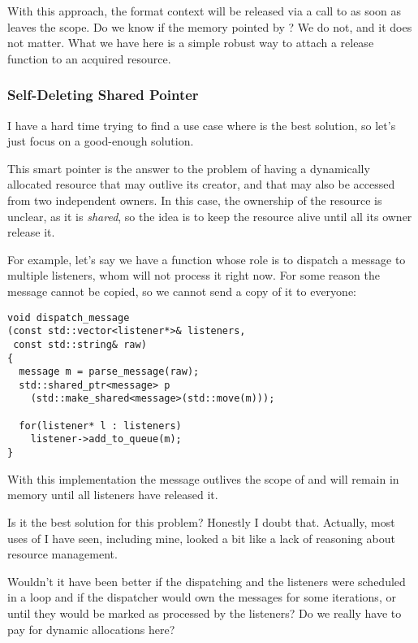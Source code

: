 With this approach, the format context will be released via a call to
 as soon as
 leaves the scope. Do we know if the memory
pointed by ? We do not, and it does not
matter. What we have here is a simple robust way to attach a release
function to an acquired resource.

\subsubsection{Self-Deleting Shared Pointer}

%
%
I have a hard time trying to find a use case where
 is the best solution, so let's just focus on a
good-enough solution.

This smart pointer is the answer to the problem of having a
dynamically allocated resource that may outlive its creator, and that
may also be accessed from two independent owners. In this case, the
ownership of the resource is unclear, as it is \emph{shared}, so the
idea is to keep the resource alive until all its owner release it.

For example, let's say we have a function whose role is to dispatch a
message to multiple listeners, whom will not process it right now. For
some reason the message cannot be copied, so we cannot send a copy of
it to everyone:

\begin{lstlisting}
void dispatch_message
(const std::vector<listener*>& listeners,
 const std::string& raw)
{
  message m = parse_message(raw);
  std::shared_ptr<message> p
    (std::make_shared<message>(std::move(m)));

  for(listener* l : listeners)
    listener->add_to_queue(m);
}
\end{lstlisting}

With this implementation the message outlives the scope of
 and will remain in memory until all
listeners have released it.

Is it the best solution for this problem? Honestly I doubt
that. Actually, most uses of  I have seen,
including mine, looked a bit like a lack of reasoning about resource
management.

Wouldn't it have been better if the dispatching and the listeners were
scheduled in a loop and if the dispatcher would own the messages for
some iterations, or until they would be marked as processed by the
listeners? Do we really have to pay for dynamic allocations here?

